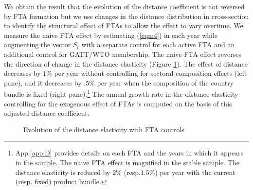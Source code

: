 \documentclass[12pt,twoside,a4paper,notitlepage]{article}
\begin{document}
We obtain the result that the evolution of the distance coefficient is not reversed by FTA formation but we use changes in the distance distribution in cross-section to identify the structural effect of FTAs to allow the effect to vary overtime.
We measure the naive FTA effect by estimating (\ref{eqn:4}) in each year while augmenting the vector $S_t$ with a separate control for each active FTA and an additional control for GATT/WTO membership.
The naive FTA effect reverses the direction of change in the distance elasticity (Figure \ref{fig:ftabench}).
The effect of distance decreases by $1$\% per year without controlling for sectoral composition effects (left pane), and it decreases by $.5$\% per year when the composition of the country bundle is fixed (right pane).\footnote{App.\ref{app:D} provides details on each FTA and the years in which it appears in the sample.
The naive FTA effect is magnified in the stable sample.
The distance elasticity is reduced by $2$\% (resp.$1.5$\%) per year with the current (resp.
fixed) product bundle.}
The annual growth rate in the distance elasticity controlling for the exogenous effect of FTAs is computed on the basis of this adjusted distance coefficient.


\begin{figure}[h!]
\caption{Evolution of the distance elasticity with FTA controls \label{fig:ftabench}}
\begin{center}
\setlength{\fboxrule}{1pt} %
\setlength{\fboxsep}{.1in} %
\end{center}
\end{figure} 
\end{document}
